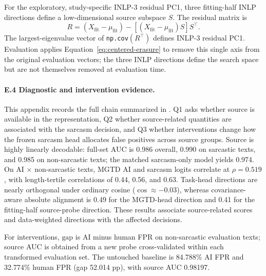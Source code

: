 For the exploratory, study-specific INLP-3 residual PC1, three fitting-half INLP directions define a low-dimensional source subspace $S$. The residual matrix is
\begin{equation}
  R=(X_{\mathrm{fit}}-\mu_{\mathrm{fit}})-[(X_{\mathrm{fit}}-\mu_{\mathrm{fit}})S]S^{\top}.
  \label{eq:srcorth-residual}
\end{equation}
The largest-eigenvalue vector of \texttt{np.cov}$(R^{\top})$ defines INLP-3 residual PC1. Evaluation applies Equation~\ref{eq:centered-erasure} to remove this single axis from the original evaluation vectors; the three INLP directions define the search space but are not themselves removed at evaluation time.

\label{app:repr-evidence}\paragraph{E.4 Diagnostic and intervention evidence.} This appendix records the full chain summarized in . Q1 asks whether source is available in the representation, Q2 whether source-related quantities are associated with the sarcasm decision, and Q3 whether interventions change how the frozen sarcasm head allocates false positives across source groups. Source is highly linearly decodable: full-set AUC is 0.986 overall, 0.990 on sarcastic texts, and 0.985 on non-sarcastic texts; the matched sarcasm-only model yields 0.974. On AI $\times$ non-sarcastic texts, MGTD AI and sarcasm logits correlate at $\rho=0.519$, with length-tertile correlations of 0.44, 0.56, and 0.63. Task-head directions are nearly orthogonal under ordinary cosine ($\cos\approx-0.03$), whereas covariance-aware absolute alignment is 0.49 for the MGTD-head direction and 0.41 for the fitting-half source-probe direction. These results associate source-related scores and data-weighted directions with the affected decisions.

For interventions, $\text{gap}$ is AI minus human FPR on non-sarcastic evaluation texts; source AUC is obtained from a new probe cross-validated within each transformed evaluation set. The untouched baseline is 84.788\% AI FPR and 32.774\% human FPR (gap 52.014 pp), with source AUC 0.98197.

